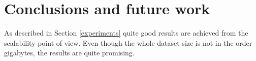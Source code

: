 \documentclass{sig-alternate-05-2015}
\begin{document}
\section{Conclusions and future work}
As described in Section \ref{experiments} quite good results are achieved from the scalability point of view. Even though the whole dataset size is not in the order gigabytes, the results are quite promising.


%

%

%
%
\end{document}
